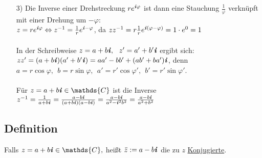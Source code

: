 \documentclass[12pt,titlepage, pdf]{article}
\newcommand{\C}{\mathds{C}}
\newcommand{\uline}[1]{\underline{#1}}
\newcommand*\colvec[1]{
	\global\colveccount#1
	\begin{pmatrix}
		\colvecnext
	}
\def\colvecnext#1{
		#1
		\global\advance\colveccount-1
		\ifnum\colveccount>0
		\\
		\expandafter\colvecnext
		\else
	\end{pmatrix}
	\fi
}
\renewcommand{\i}{\textbf{\textit{i}}}
\renewcommand{\>}{\rightarrow}
\renewcommand{\*}{\cdot}
\renewcommand{\phi}{\varphi}
\renewcommand{\vec}[1]{\colvec{#1}}
\begin{document}
\begin{itemize}
\begin{minipage}[c]{0.45\textwidth}
		\end{minipage}
		\item[3)] Die Inverse einer Drehstreckung $re^{\i\phi}$ ist dann eine Stauchung $\frac{1}{\phi}$ verknüpft mit einer Drehung um $-\phi:$\\
		$z = re^{\i\phi} \Leftrightarrow z^{-1} = \frac{1}{r} e^{\i-\phi}$, da $zz^{-1} = r \frac{1}{r} e^{\i(\phi - \phi)} = 1 \cdot e^0 = 1$\\
		\\
		In der Schreibweise $z= a+b\i,~~ z' = a' + b'\i$ ergibt sich:\\ $zz' = (a +b\i)(a' + b'\i) = aa' -bb' + (ab' + ba')\i$, denn \\$a = r \cos \phi,~~ b= r \sin\phi,~~ a' = r' \cos\phi',~~ b' = r' \sin\phi'$.\\ \\
		Für $z = a +b\i \in \C$ ist die Inverse\\ $z^{-1} = \frac{1}{a+b\i} = \frac{a -b\i}{(a+ b\i)(a -b\i)}= \frac{a-b\i}{a^2 - \i^2 b^2} = \frac{a-b\i}{a^2 +b^2}$
	\end{itemize}
	\subsection{Definition}
		Falls $z = a+b\i \in \C,$ heißt $\bar{z} := a-b\i$ die zu $z$ \uline{Konjugierte}.
	
\end{document}
